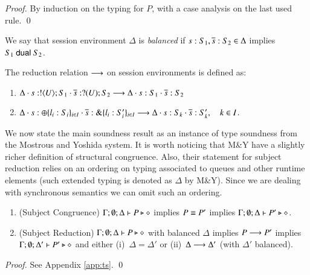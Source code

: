 \begin{proof}
	By induction on the typing for $P$, with a case analysis on the last used rule. 
	\qed
\end{proof}

\begin{definition}\label{d:wtenv}\rm
	We say that session environment $\Delta$ is {\em balanced} if
	$s: S_1, \overline{s}: S_2 \in \Delta$ implies $S_1 \ \mathsf{dual}\  S_2$.
\end{definition}

\begin{definition}\rm
	\label{def:ses_red}
	The reduction relation $\longrightarrow$ on session environments is defined as:
%
	\begin{enumerate}[$-$]
		\item	$\Delta \cdot s: ! \langle U \rangle ; S_1 \cdot \overline{s}: ? (U) ; S_2 \longrightarrow \Delta \cdot s: S_1 \cdot \overline{s}: S_2$
		\item	$\Delta \cdot s: \oplus \{l_i: S_i\}_{i \in I} \cdot \overline{s}: \& \{l_i: S_i'\}_{i \in I} \longrightarrow \Delta \cdot s: S_k \cdot \overline{s}: S_k', \quad k \in I$.
	\end{enumerate}
\end{definition}
%
We now state the main soundness result as an instance
of type soundness from the Mostrous and Yoshida system.
It is worth noticing that M\&Y have a slightly richer
definition of structural congruence.
Also, their statement for subject reduction relies on an
ordering on typing associated to queues and other 
runtime elements (such extended typing is denoted as $\Delta$ by M\&Y).
Since we are dealing with synchronous semantics we can omit such an ordering.

\begin{theorem}\label{t:sr}\rm
%
	\begin{enumerate}[1.]
		\item	(Subject Congruence)
			$\Gamma; \emptyset; \Delta \vdash P \triangleright \diamond$
			implies
			$P \equiv P'$ implies $\Gamma; \emptyset; \Delta \vdash P' \triangleright \diamond$.

		\item	(Subject Reduction)
			$\Gamma; \emptyset; \Delta \vdash P \triangleright \diamond$
			with
			balanced $\Delta$
			implies
			$P \longrightarrow P'$ implies $\Gamma; \emptyset; \Delta'  \vdash P' \triangleright \diamond$
			and either (i)~$\Delta = \Delta'$ or (ii)~$\Delta \longrightarrow \Delta'$
			(with $\Delta'$ balanced).
	\end{enumerate}
\end{theorem}

\begin{proof}
	See Appendix \ref{app:ts}.
	\qed
\end{proof}
